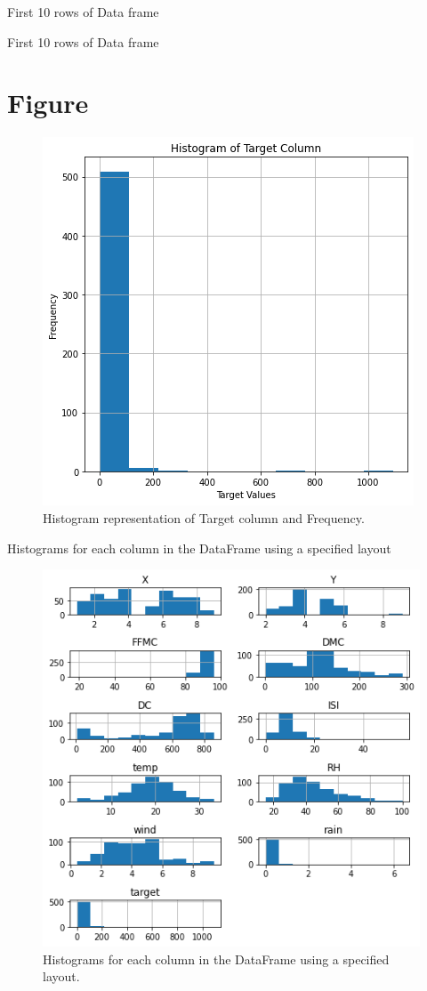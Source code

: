 \clearpage
First 10 rows of Data frame
\begin{table}[ht!]
    \centering
    
    \label{tab:DataFrame}
    \caption{First 10 rows of Data frame}
\end{table}

\clearpage
\section{Figure}
\begin{figure}[ht]
    \centering
    \includegraphics[scale=1.0]{figures/output_14_0.png}
    \caption{Histogram representation of Target column and Frequency.}
    \label{fig:example-01}
\end{figure}
\clearpage
Histograms for each column in the DataFrame using a specified layout
\begin{figure}[ht]
    \centering
    \includegraphics[scale=1.0]{figures/output_16_1.png}
    \caption{Histograms for each column in the DataFrame using a specified layout.}
    \label{fig:example-01}
\end{figure}

